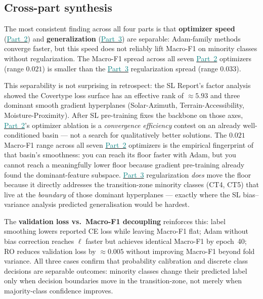 \documentclass[conference]{IEEEtran}
\newcommand{\partref}[2]{\hyperref[#2]{\textcolor{teal}{Part~#1}}}
\begin{document}
\subsection{Cross-part synthesis}\label{sec:disc:synthesis}
The most consistent finding across all four parts is that
\textbf{optimizer speed} (\partref{2}{sec:p2}) and \textbf{generalization} (\partref{3}{sec:p3}) are
separable: Adam-family methods converge faster, but this speed does not
reliably lift Macro-F1 on minority classes without regularization.
The Macro-F1 spread across all seven \partref{2}{sec:p2} optimizers (range $0.021$) is
smaller than the \partref{3}{sec:p3} regularization spread (range $0.033$).

This separability is not surprising in retrospect: the SL Report's factor
analysis showed the Covertype loss surface has an effective rank of
$\approx5.93$ and three dominant smooth gradient hyperplanes
(Solar-Azimuth, Terrain-Accessibility, Moisture-Proximity).
After SL pre-training fixes the backbone on those axes, \partref{2}{sec:p2}'s optimizer
ablation is a \emph{convergence efficiency} contest on an already
well-conditioned basin --- not a search for qualitatively better solutions.
The $0.021$ Macro-F1 range across all seven \partref{2}{sec:p2} optimizers is
the empirical fingerprint of that basin's smoothness: you can reach its
floor faster with Adam, but you cannot reach a meaningfully lower floor
because gradient pre-training already found the dominant-feature subspace.
\partref{3}{sec:p3} regularization \emph{does} move the floor because it directly
addresses the transition-zone minority classes (CT4, CT5) that live at the
\emph{boundary} of those dominant hyperplanes --- exactly where the SL
bias--variance analysis predicted generalisation would be hardest.

The \textbf{validation loss vs.\ Macro-F1 decoupling} reinforces this:
label smoothing lowers reported CE loss while leaving Macro-F1 flat;
Adam without bias correction reaches $\ell$ faster but achieves identical
Macro-F1 by epoch~40; RO reduces validation loss by $\approx 0.005$ without
improving Macro-F1 beyond fold variance.
All three cases confirm that probability calibration and discrete class
decisions are separable outcomes: minority classes change their predicted
label only when decision boundaries move in the transition-zone, not
merely when majority-class confidence improves.
\end{document}
